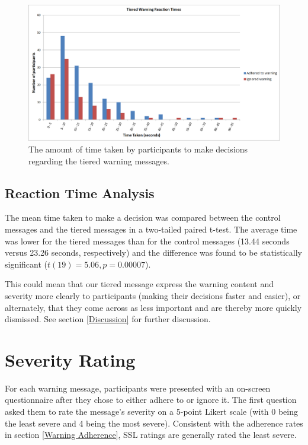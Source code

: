 \begin{figure}[!htb]
	\centering
	\includegraphics[width=\textwidth]{Figures/Time-Tiered}
	\decoRule
	\caption[Tiered warning decision times]{The amount of time taken by participants to make decisions regarding the tiered warning messages.}
	\label{fig:Time-Tiered}
\end{figure}

\subsection{Reaction Time Analysis}
The mean time taken to make a decision was compared between the control messages and the tiered messages in a two-tailed paired t-test. The average time was lower for the tiered messages than for the control messages (13.44 seconds versus 23.26 seconds, respectively) and the difference was found to be statistically significant ($t(19)=5.06, p=0.00007$).

This could mean that our tiered message express the warning content and severity more clearly to participants (making their decisions faster and easier), or alternately, that they come across as less important and are thereby more quickly dismissed. See section \ref{Discussion} for further discussion.


\section{Severity Rating}
For each warning message, participants were presented with an on-screen questionnaire after they chose to either adhere to or ignore it. The first question asked them to rate the message's severity on a 5-point Likert scale (with 0 being the least severe and 4 being the most severe). Consistent with the adherence rates in section \ref{Warning Adherence}, SSL ratings are generally rated the least severe.

